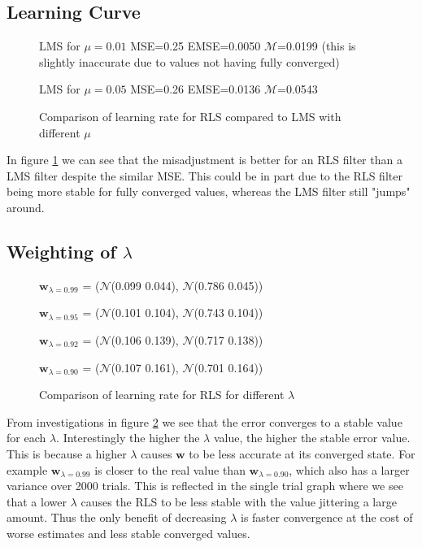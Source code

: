 \documentclass[10pt,twoside,a4paper]{report}
\begin{document}
\subsection{Learning Curve}

\begin{figure}[h!]
\centering
\resizebox{\textwidth}{!}{}
LMS for $\mu = 0.01$ MSE=0.25 EMSE=0.0050 $\mathcal{M}$=0.0199 (this is slightly inaccurate due to values not having fully converged)

LMS for $\mu = 0.05$ MSE=0.26 EMSE=0.0136 $\mathcal{M}$=0.0543
\caption{Comparison of learning rate for RLS compared to LMS with different $\mu$}
\label{fig:3_2b}
\end{figure}


In figure \ref{fig:3_2b} we can see that the misadjustment is better for an RLS filter than a LMS filter despite the similar MSE. This could be in part due to the RLS filter being more stable for fully converged values, whereas the LMS filter still "jumps" around.

\subsection{Weighting of $\lambda$}

\begin{figure}[h!]
\centering
\resizebox{\textwidth}{!}{}
$\mathbf{w}_{\lambda = 0.99}$ = ($\mathcal{N}$(0.099 0.044), $\mathcal{N}$(0.786 0.045))

$\mathbf{w}_{\lambda = 0.95}$ = ($\mathcal{N}$(0.101 0.104), $\mathcal{N}$(0.743 0.104))

$\mathbf{w}_{\lambda = 0.92}$ = ($\mathcal{N}$(0.106 0.139), $\mathcal{N}$(0.717 0.138))

$\mathbf{w}_{\lambda = 0.90}$ = ($\mathcal{N}$(0.107 0.161), $\mathcal{N}$(0.701 0.164))
\caption{Comparison of learning rate for RLS for different $\lambda$}
\label{fig:3_2c}
\end{figure}

From investigations in figure \ref{fig:3_2c} we see that the error converges to a stable value for each $\lambda$. Interestingly the higher the $\lambda$ value, the higher the stable error value. This is because a higher $\lambda$ causes $\mathbf{w}$ to be less accurate at its converged state. For example $\mathbf{w}_{\lambda = 0.99}$ is closer to the real value than $\mathbf{w}_{\lambda = 0.90}$, which also has a larger variance over 2000 trials. This is reflected in the single trial graph where we see that a lower $\lambda$ causes the RLS to be less stable with the value jittering a large amount. Thus the only benefit of decreasing $\lambda$ is faster convergence at the cost of worse estimates and less stable converged values.
\end{document}

